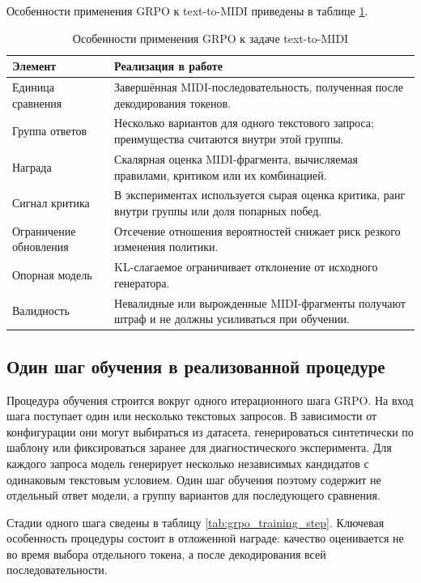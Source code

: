 \documentclass[a4paper,12pt]{extarticle}
\begin{document}
Особенности применения GRPO к text-to-MIDI приведены в
таблице \ref{tab:grpo_midi_specifics}.

\begin{table}[ht]
\centering
\caption{Особенности применения GRPO к задаче text-to-MIDI}
\label{tab:grpo_midi_specifics}
\begin{tabular}{|p{}|p{}|}
\hline
\textbf{Элемент} & \textbf{Реализация в работе} \\
\hline
Единица сравнения & Завершённая MIDI-последовательность, полученная после декодирования токенов. \\
\hline
Группа ответов & Несколько вариантов для одного текстового запроса; преимущества считаются внутри этой группы. \\
\hline
Награда & Скалярная оценка MIDI-фрагмента, вычисляемая правилами, критиком или их комбинацией. \\
\hline
Сигнал критика & В экспериментах используется сырая оценка критика, ранг внутри группы или доля попарных побед. \\
\hline
Ограничение обновления & Отсечение отношения вероятностей снижает риск резкого изменения политики. \\
\hline
Опорная модель & KL-слагаемое ограничивает отклонение от исходного генератора. \\
\hline
Валидность & Невалидные или вырожденные MIDI-фрагменты получают штраф и не должны усиливаться при обучении. \\
\hline
\end{tabular}
\end{table}

\subsection{Один шаг обучения в реализованной процедуре}

Процедура обучения строится вокруг одного итерационного шага GRPO.
На вход шага поступает один или несколько текстовых запросов.
В зависимости от конфигурации они могут выбираться из датасета,
генерироваться синтетически по шаблону или фиксироваться заранее для
диагностического эксперимента. Для каждого запроса модель генерирует
несколько независимых кандидатов с одинаковым текстовым
условием. Один шаг обучения поэтому содержит не отдельный ответ модели, а
группу вариантов для последующего сравнения.

Стадии одного шага сведены в таблицу \ref{tab:grpo_training_step}.
Ключевая особенность процедуры состоит в отложенной награде: качество
оценивается не во время выбора отдельного токена, а после декодирования всей
последовательности.
\end{document}
